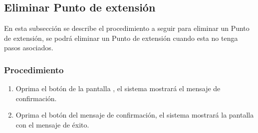 \subsection{Eliminar Punto de extensión}

En esta subsección se describe el procedimiento a seguir para eliminar un Punto de extensión, se podrá eliminar un Punto de extensión cuando esta no tenga pasos asociados.

\subsubsection{Procedimiento}
\begin{enumerate}
	\item Oprima el botón \btnEliminar de la pantalla , el sistema mostrará el mensaje de confirmación.
	
	\item Oprima el botón  del mensaje de confirmación, el sistema mostrará la pantalla  con el mensaje de éxito.
\end{enumerate}


